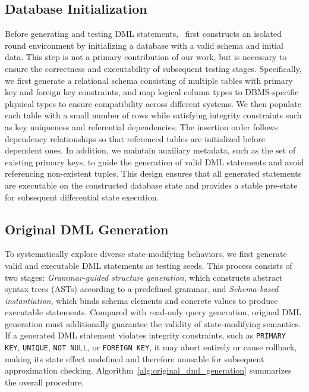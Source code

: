 \subsection{Database Initialization}
\label{subsec:Database Initialization}
Before generating and testing DML statements, \toolname\ first constructs an isolated round environment by initializing a database with a valid schema and initial data. 
This step is not a primary contribution of our work, but is necessary to ensure the correctness and executability of subsequent testing stages.
Specifically, we first generate a relational schema consisting of multiple tables with primary key and foreign key constraints, and map logical column types to DBMS-specific physical types to ensure compatibility across different systems. 
We then populate each table with a small number of rows while satisfying integrity constraints such as key uniqueness and referential dependencies. 
The insertion order follows dependency relationships so that referenced tables are initialized before dependent ones. 
In addition, we maintain auxiliary metadata, such as the set of existing primary keys, to guide the generation of valid DML statements and avoid referencing non-existent tuples. 
This design ensures that all generated statements are executable on the constructed database state and provides a stable pre-state for subsequent differential state execution.

\vspace{-2mm}
\subsection{Original DML Generation}
\label{subsec:Original DML Generation}

To systematically explore diverse state-modifying behaviors, we first generate valid and executable DML statements as testing seeds.
This process consists of two stages: \emph{Grammar-guided structure generation}, which constructs abstract syntax trees (ASTs) according to a predefined grammar, and \emph{Schema-based instantiation}, which binds schema elements and concrete values to produce executable statements.
Compared with read-only query generation, original DML generation must additionally guarantee the validity of state-modifying semantics. 
If a generated DML statement violates integrity constraints, such as \texttt{PRIMARY KEY}, \texttt{UNIQUE}, \texttt{NOT NULL}, or \texttt{FOREIGN KEY}, it may abort entirely or cause rollback, making its state effect undefined and therefore unusable for subsequent approximation checking.  
Algorithm~\ref{alg:original_dml_generation} summarizes the overall procedure. 

